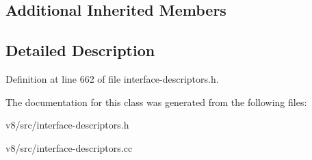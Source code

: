 \subsection*{Additional Inherited Members}


\subsection{Detailed Description}


Definition at line 662 of file interface-\/descriptors.\+h.



The documentation for this class was generated from the following files\+:\begin{DoxyCompactItemize}
\item 
v8/src/interface-\/descriptors.\+h\item 
v8/src/interface-\/descriptors.\+cc\end{DoxyCompactItemize}

